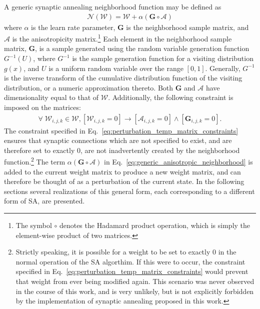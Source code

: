 \documentclass[11pt]{afthesis}
\begin{document}
	A generic synaptic annealing neighborhood function may be defined as
	\begin{align}\label{eq:generic_anisotropic_neighborhood}
	\mathcal{N} (\boldsymbol{\mathcal{W}}) = \boldsymbol{\mathcal{W}} + \alpha (\boldsymbol{G} \circ\boldsymbol{\mathcal{A}})
	\end{align}
	\noindent where $\alpha$ is the learn rate parameter, $\boldsymbol{G}$ is the neighborhood sample matrix, and $\boldsymbol{\mathcal{A}}$ is the anisotropicity matrix.\footnote{The symbol $\circ$ denotes the Hadamard product operation, which is simply the element-wise product of two matrices.} Each element in the neighborhood sample matrix, $\boldsymbol{G}$, is a sample generated using the random variable generation function ${G}^{-1}(U)$, where ${G}^{-1}$ is the sample generation function for a visiting distribution $g(x)$, and $U$ is a uniform random variable over the range $[0,1]$. Generally, ${G}^{-1}$ is the inverse transform of the cumulative distribution function of the visiting distribution, or a numeric approximation thereto. Both $\boldsymbol{G}$ and $\boldsymbol{\mathcal{A}}$ have dimensionality equal to that of $\boldsymbol{\mathcal{W}}$. Additionally, the following constraint is imposed on the matrices:\begin{align}\label{eq:perturbation_temp_matrix_constraints}
	\forall \; \mathcal{W}_{i,j,k} \in \boldsymbol{\mathcal{W}},  [\mathcal{W}_{i,j,k}=0] \rightarrow [\boldsymbol{\mathcal{A}}_{i,j,k}=0] \wedge [\boldsymbol{G}_{i,j,k}=0].
	\end{align}
	\noindent The constraint specified in Eq.~\ref{eq:perturbation_temp_matrix_constraints} ensures that synaptic connections which are not specified to exist, and are therefore set to exactly $0$, are not inadvertently created by the neighborhood function.\footnote{Strictly speaking, it is possible for a weight to be set to exactly $0$ in the normal operation of the SA algorthim. If this were to occur, the constraint specified in Eq.~\ref{eq:perturbation_temp_matrix_constraints} would prevent that weight from ever being modified again. This scenario was never observed in the course of this work, and is very unlikely, but is not explicitly forbidden by the implementation of synaptic annealing proposed in this work.} The term $\alpha (\boldsymbol{G} \circ\boldsymbol{\mathcal{A}})$ in Eq.~\ref{eq:generic_anisotropic_neighborhood} is added to the current weight matrix to produce a new weight matrix, and can therefore be thought of as a perturbation of the current state. In the following sections several realizations of this general form, each corresponding to a different form of SA, are presented.
	
\end{document}
